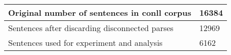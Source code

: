 	\begin{tabular}{|l|l|}
		\hline
		Original number of sentences in conll corpus & 16384\\ 
		\hline
		Sentences after discarding disconnected parses & 12969\\ 
		\hline
		Sentences used for experiment and analysis & 6162\\ 
		\hline
	\end{tabular}
